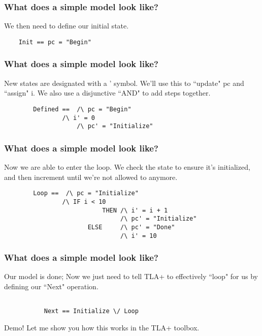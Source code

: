 \documentclass{beamer}
\begin{document}
\begin{frame}[fragile]
	\frametitle{What does a simple model look like?}
	We then need to define our initial state.
	\begin{lstlisting}
	Init == pc = "Begin"
	\end{lstlisting}


\end{frame}

\begin{frame}[fragile]
	\frametitle{What does a simple model look like?}
	New states are designated with a ' symbol.  We'll use this to ``update" pc and ``assign" i. We also use a disjunctive ``AND" to add steps together. 
	\begin{lstlisting}
        Defined ==  /\ pc = "Begin" 
	            /\ i' = 0 
                    /\ pc' = "Initialize"
	\end{lstlisting}


\end{frame}

\begin{frame}[fragile]
	\frametitle{What does a simple model look like?}
	Now we are able to enter the loop.  We check the state to ensure it's initialized, and then increment until we're not allowed to anymore. 
	\begin{lstlisting}
        Loop ==  /\ pc = "Initialize" 
	            /\ IF i < 10  
                           THEN /\ i' = i + 1 
                                /\ pc' = "Initialize"
                       ELSE     /\ pc' = "Done"
                                /\ i' = 10
	\end{lstlisting}


\end{frame}
\begin{frame}[fragile]
	\frametitle{What does a simple model look like?}
Our model is done; Now we just need to tell TLA+ to effectively ``loop" for us by defining our ``Next" operation.
	\begin{lstlisting}

           Next == Initialize \/ Loop
	\end{lstlisting}
\end{frame}
\begin{frame}{Demo!}
    Let me show you how this works in the TLA+ toolbox.
\end{frame}
\end{document}
